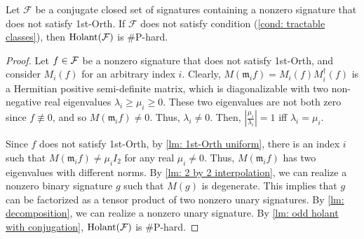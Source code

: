 \begin{lemma}\label{lm: not 1st-orth is hard}
    Let $\mathcal{F}$ be a conjugate closed set of signatures containing a nonzero signature that does not satisfy {\sc 1st-Orth}. 
    If $\mathcal{F}$ does not satisfy condition \rm{(\ref{cond: tractable classes})},
    then $\operatorname{Holant}(\mathcal{F})$ is \#P-hard.
\end{lemma}
 
\begin{proof}
    Let $f\in\mathcal{F}$ be a nonzero signature that does not satisfy {\sc 1st-Orth}, and consider $M_{i}(f)$ for an arbitrary index $i$.
    Clearly, $M(\mathfrak{m}_if)=M_{i}(f)M^\dagger_{i}(f)$ is a Hermitian positive semi-definite matrix, which is diagonalizable with two non-negative real eigenvalues $\lambda_i\geqslant\mu_i\geqslant 0$.
    These two eigenvalues are not both zero since $f \not\equiv 0$, and so $M(\mathfrak{m}_if)\neq 0$. Thus, $\lambda_i\neq 0$.
    Then, $|\frac{\mu_i}{\lambda_i}|=1$ iff $\lambda_i=\mu_i$. 

    Since $f$ does not satisfy {\sc 1st-Orth}, by \cref{lm: 1st-Orth uniform}, there is an index $i$ such that $M(\mathfrak{m}_if)\neq  \mu_i I_2$ for any real $\mu_i\neq 0$. 
    Thus, $M(\mathfrak{m}_if)$ has two eigenvalues with different norms. 
    By \cref{lm: 2 by 2 interpolation}, we can realize a nonzero binary signature $g$ such that $M(g)$ is degenerate. This implies that  $g$ can be factorized as a tensor product of two nonzero unary signatures. 
    By \cref{lm: decomposition}, we can realize a nonzero unary signature.
    By \cref{lm: odd holant with conjugation}, $\operatorname{Holant}(\mathcal{F})$ is \#P-hard.
\end{proof}